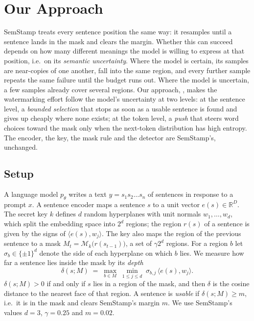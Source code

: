 
\section{Our Approach}
\label{sec:approach}

SemStamp treats every sentence position the same way: it resamples until a sentence lands in the mask and clears the
margin. Whether this can succeed depends on how many different meanings the model is willing to express at that
position, i.e.\ on its \emph{semantic uncertainty}. Where the model is certain, its samples are near-copies of one
another, fall into the same region, and every further sample repeats the same failure until the budget runs out. Where
the model is uncertain, a few samples already cover several regions. Our approach, \ours, makes the watermarking effort
follow the model's uncertainty at two levels: at the sentence level, a \emph{bounded selection} that stops as soon as a
usable sentence is found and gives up cheaply where none exists; at the token level, a \emph{push} that steers word
choices toward the mask only when the next-token distribution has high entropy. The encoder, the key, the mask rule and
the detector are SemStamp's, unchanged.

\subsection{Setup}
\label{sec:setup}

A language model $p_\theta$ writes a text $y = s_1 s_2 \dots s_n$ of sentences in response to a prompt $x$. A sentence
encoder maps a sentence $s$ to a unit vector $e(s) \in \mathbb{R}^D$. The secret key $k$ defines $d$ random hyperplanes
with unit normals $w_1, \dots, w_d$, which split the embedding space into $2^d$ regions; the region $r(s)$ of a sentence
is given by the signs of $\langle e(s), w_j \rangle$. The key also maps the region of the previous sentence to a mask
$M_t = \mathcal{M}_k\big(r(s_{t-1})\big)$, a set of $\gamma 2^d$ regions. For a region $b$ let $\sigma_b \in \{\pm 1\}^d$
denote the side of each hyperplane on which $b$ lies. We measure how far a sentence lies inside the mask by its
\emph{depth}
\begin{equation}
  \delta(s; M) \;=\; \max_{b \in M} \; \min_{1 \le j \le d} \; \sigma_{b,j} \, \langle e(s), w_j \rangle .
  \label{eq:depth}
\end{equation}
$\delta(s; M) > 0$ if and only if $s$ lies in a region of the mask, and then $\delta$ is the cosine distance to the
nearest face of that region. A sentence is \emph{usable} if $\delta(s; M) \ge m$, i.e.\ it is in the mask and clears
SemStamp's margin $m$. We use SemStamp's values $d = 3$, $\gamma = 0.25$ and $m = 0.02$.

